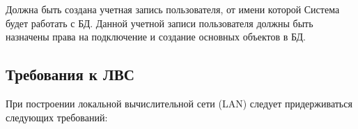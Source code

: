 Должна быть создана учетная запись пользователя, от имени которой Система будет работать с БД.
Данной учетной записи пользователя должны быть назначены права на подключение и создание основных объектов в БД.

%
%
%
%
%
%


\subsection{Требования к ЛВС}

При построении локальной вычислительной сети (LAN) следует придерживаться следующих требований:
